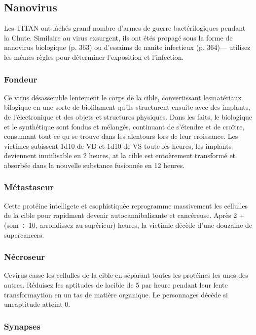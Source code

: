 \subsection{Nanovirus} 

Les TITAN ont lâchés grand nombre d'armes de guerre bactérilogiques pendant la Chute. Similaire au virus exsurgent, ils ont étés propagé sous la forme de nanovirus biologique (p. 363) ou d'essaims de nanite infectieux (p. 364)— utilisez les mêmes règles pour déterminer l'exposition et l'infection. 

\subsubsection{Fondeur} 

Ce virus désassemble lentement le corps de la cible, convertissant lesmatériaux bilogique en une sorte de biofilament qu'ils structurent ensuite avec des implants, de l'électronique et des objets et structures physiques. Dans les faits, le biologique et le synthétique sont fondus et mélangés, continuant de s'étendre et de croître, consumant tout ce qu se trouve dans les alentours lors de leur croissance. Les victimes subissent 1d10 de VD et 1d10 de VS toute les heures, les implants deviennent inutilisable en 2 heures, at la cible est entoèrement transformé et absorbée dans la nouvelle substance fusionnée en 12 heures. 

\subsubsection{Métastaseur} 

Cette protéine intelligete et esophistiquée reprogramme massivement les cellulles de la cible pour rapidment devenir autocannibalisante et cancéreuse. Après 2 + (som $\div$ 10, arrondissez au supérieur) heures, la victimle décède d'une douzaine de supercancers. 

\subsubsection{Nécroseur} 

Cevirus casse les cellulles de la cible en séparant toutes les protéines les unes des autres. Réduisez les aptitudes de lacible de 5 par heure pendant leur lente transformaytion en un tas de matière organique. Le personnages décède si uneaptitude atteint 0. 

\subsubsection{Synapses} 

